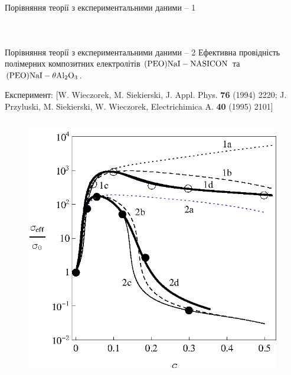 \documentclass[10pt]{beamer}
\begin{document}
\begin{frame}{Порівняння теорії з експериментальними даними -- 1}
\begin{columns}[T,onlytextwidth]
\begin{figure}
      \end{figure}
      
\end{columns}

\end{frame}
\begin{frame}{Порівняння теорії з експериментальними даними -- 2}
Ефективна провідність полімерних композитних електролітів $\rm (PEO)NaI-NASICON$ та $\rm (PEO)NaI-\theta Al_2O_3$.
\vspace{-5pt}

\scriptsize{Експеримент: [W. Wieczorek, M. Siekierski, J. Appl. Phys. {\bf 76} (1994) 2220; J. Przyluski, M. Siekierski, W. Wieczorek, Electrichimica A. {\bf 40} (1995) 2101]}
\vspace{-5pt}

\footnotesize
\begin{columns}[T,onlytextwidth]
      \begin{figure}
        \centering
        \includegraphics[width=0.99\textwidth]{images/Fig2_PEO-NaI_NASICON_PEO-NaI-theta-Al2O3.eps}
      \end{figure}


\end{columns}
\end{frame}
\end{document}
